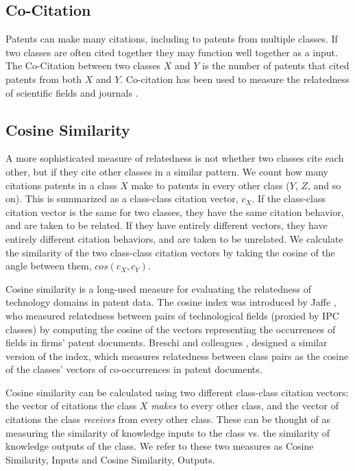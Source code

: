 \documentclass[pre,reprint,groupedaddress,superscriptaddress]{revtex4-1}
\begin{document}
\subsection{Co-Citation}
Patents can make many citations, including to patents from multiple classes. If two classes are often cited together they may function well together as a input. The Co-Citation between two classes $X$ and $Y$ is the number of patents that cited patents from both $X$ and $Y$. Co-citation has been used to measure the relatedness of scientific fields and journals \cite{Uzzi2013, Wallace2009}.


\subsection{Cosine Similarity}
A more sophisticated measure of relatedness is not whether two classes cite each other, but if they cite other classes in a similar pattern. We count how many citations patents in a class $X$ make to patents in every other class ($Y$, $Z$, and so on). This is summarized as a class-class citation vector, $c_X$. If the class-class citation vector is the same for two classes, they have the same citation behavior, and are taken to be related. If they have entirely different vectors, they have entirely different citation behaviors, and are taken to be unrelated. We calculate the similarity of the two class-class citation vectors by taking the cosine of the angle between them, $cos(c_X, c_Y)$. 

Cosine similarity is a long-used measure for evaluating the relatedness of technology domains in patent data. The cosine index was introduced by Jaffe \cite{Jaffe1986, Jaffe1989}, who measured relatedness between pairs of technological fields (proxied by IPC classes) by computing the cosine of the vectors representing the occurrences of fields in firms' patent documents. Breschi and colleagues \cite{Breschi2003}, designed a similar version of the index, which measures relatedness between class pairs as the cosine of the classes' vectors of co-occurrences in patent documents. 

Cosine similarity can be calculated using two different class-class citation vectors: the vector of citations the class $X$ \textit{makes} to every other class, and the vector of citations the class \textit{receives} from every other class. These can be thought of as measuring the similarity of knowledge inputs to the class vs. the similarity of knowledge outputs of the class. We refer to these two measures as Cosine Similarity, Inputs and Cosine Similarity, Outputs.
\end{document}
